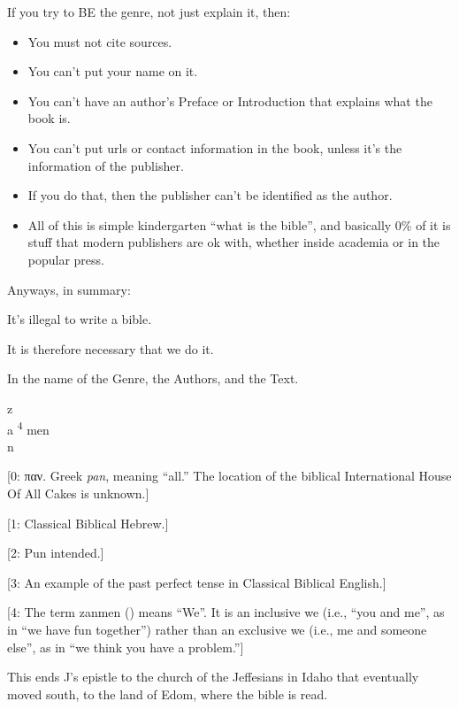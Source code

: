 { \hX{} }
{ \eX{} }
{
    If you try to BE the genre, not just explain it, then:

    \begin{itemize}

    \item You must not cite sources.

    \item You can't put your name on it.

    \item You can't have an author's Preface or Introduction that explains what the book is.

    \item You can't put urls or contact information in the book, unless it's the information of the publisher.

    \item If you do that, then the publisher can't be identified as the author.

    \item All of this is simple kindergarten ``what is the bible'', and basically 0\% of it is stuff that modern publishers are ok with, whether inside academia or in the popular press.

    \end{itemize}
}

{ \hX{} }
{ \eX{} }
{
    Anyways, in summary:

    It's illegal to write a bible.

    It is therefore necessary that we do it.
}

{ \hX{} }
{ \eX{} }
{
    In the name of the Genre, the Authors, and the Text.

    \noindent z\\
    a \textsuperscript{4} men\\
    n
}

{ \hX{} }
{ \eX{} }
{
    [0: παν. Greek \emph{pan}, meaning ``all.'' The location of the biblical International House Of All Cakes is unknown.]

    [1: Classical Biblical Hebrew.]

    [2: Pun intended.]

    [3: An example of the past perfect tense in Classical Biblical English.]

    [4: The term zanmen () means ``We''. It is an inclusive we (i.e., ``you and me'', as in ``we have fun together'') rather than an exclusive we (i.e., me and someone else'', as in ``we think you have a problem.'']
}

{ \hX{} }
{ \eX{} }
{
    This ends J's epistle to the church of the Jeffesians in Idaho that eventually moved south, to the land of Edom, where the bible is read.
}

